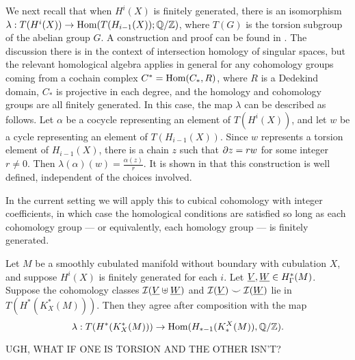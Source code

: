 \documentclass{amsart}
\begin{document}
We next recall that when $H^i(X)$ is finitely generated, there is an isomorphism $\lambda:T(H^i(X))\to \textup{Hom}(T(H_{i-1}(X));\mathbb{Q}/\mathbb{Z})$, where $T(G)$ is the torsion subgroup of the abelian group $G$. A construction and proof can be found in \cite[Section 8.4.3]{Frie20}. The discussion there is in the context of intersection homology of singular spaces, but the relevant homological algebra applies in general for any cohomology groups coming from a cochain complex $C^*=\textup{Hom}(C_*,R)$, where $R$ is a Dedekind domain, $C_*$ is projective in each degree, and the homology and cohomology groups are all finitely generated. In this case, the map $\lambda$ can be described as follows. Let $\alpha$ be a cocycle representing an element of $T(H^i(X))$, and let $w$ be a cycle representing an element of $T(H_{i-1}(X))$. Since $w$ represents a torsion element of $H_{i-1}(X)$, there is a chain $z$ such that $\partial z=rw$ for some integer $r\neq 0$. Then $\lambda(\alpha)(w)=\frac{\alpha(z)}{r}$. It is shown in \cite{Frie20} that this construction is well defined, independent of the choices involved. 

In the current setting we will apply this to cubical cohomology with integer coefficients, in which case the homological conditions are satisfied so long as each cohomology group --- or equivalently, each homology group --- is finitely generated.  


\begin{proposition}
Let $M$ be a smoothly cubulated manifold without boundary with cubulation $X$, and suppose $H^i(X)$ is finitely generated for each $i$. Let $\underline{V},\underline{W}\in H^*_\Gamma(M)$. Suppose the cohomology classes $\mathcal{I}(\underline{V}\uplus\underline{W})$ and $\mathcal{I}(\underline{V}) \smile \mathcal{I}(\underline{W})$ lie in $T(H^*(K_X^*(M)))$. Then they agree after composition with the map $$\lambda:T(H^*(K_X^*(M)))\to \textup{Hom}(H_{*-1}(K_*^X(M)),\mathbb{Q}/\mathbb{Z}).$$ 
\end{proposition}

UGH, WHAT IF ONE IS TORSION AND THE OTHER ISN'T?
\end{document}
